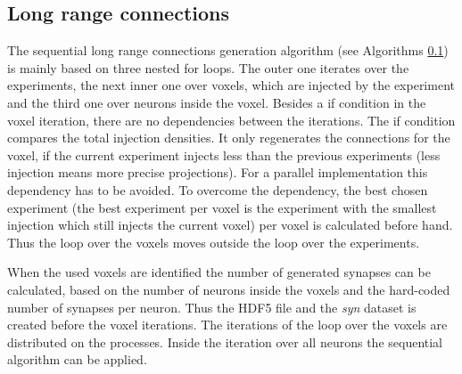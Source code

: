 

\subsection{Long range connections}

The sequential long range connections generation algorithm (see Algorithms \ref{}) is mainly based on three nested for loops.
The outer one iterates over the experiments, the next inner one over voxels, which are injected by the experiment and the third
one over neurons inside the voxel.
Besides a if condition in the voxel iteration, there are no dependencies between the iterations.
The if condition compares the total injection densities.
It only regenerates the connections for the voxel, if the current
experiment injects less than the previous experiments (less injection means more precise projections).
For a parallel implementation this dependency has to be avoided.
To overcome the dependency, the best chosen experiment (the best experiment per voxel is the experiment with the smallest injection which still injects the current voxel) per voxel is calculated before hand.
Thus the loop over the voxels moves outside the loop over the experiments.

When the used voxels are identified the number of generated synapses can be calculated, based on the
number of neurons inside the voxels and the hard-coded number of synapses per neuron.
Thus the HDF5 file and the \emph{syn} dataset is created before the voxel iterations.
The iterations of the loop over the voxels are distributed on the processes.
Inside the iteration over all neurons the sequential algorithm can be applied.



